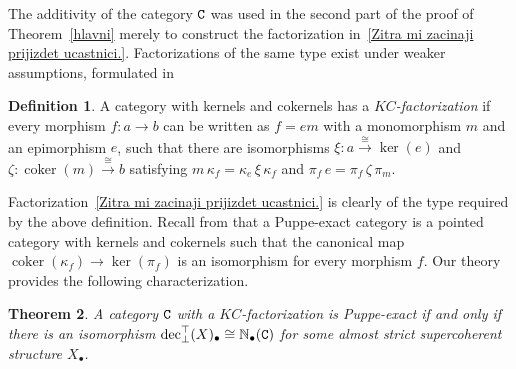 \documentclass[12pt,leqno]{amsart}
\newtheorem{theorem}{Theorem}%
\theoremstyle{definition}
\newtheorem{definition}[theorem]{Definition}
\def\uldec{{\rm dec}_{\bot}^{\top}}
\newcommand{\C}{{\tt C}}
\newcommand{\NN}{\mathbb{N}}
\newcommand{\4}{\texttt{4}}
\DeclareMathOperator{\coker}{coker}
\begin{document}
The additivity of the category $\C$ was used in the second part of the
proof of Theorem~\ref{hlavni} merely to construct the
factorization in~\eqref{Zitra mi zacinaji prijizdet ucastnici.}.
Factorizations of the same type exist under weaker assumptions,
formulated in

\begin{definition}
A category with kernels and cokernels has a
  \textit{$KC$-factorization} if every morphism $f\colon a\to b$
can be written as $f=em$ with a monomorphism $m$ and an epimorphism
$e$, such that  there are isomorphisms
$\xi\colon a\xrightarrow\cong \ker(e)$ and $\zeta\colon
\coker(m)\xrightarrow\cong b$ 
satisfying
$m \,\kappa_f=\kappa_e \,\xi \, \kappa_f$ and $\pi_f \,e=\pi_f \,\zeta\,\pi_m$.
\end{definition}

Factorization~\eqref{Zitra mi zacinaji prijizdet ucastnici.} is
clearly of the type required by the above definition.
Recall from \cite[S.~1.1.]{BorceuxGrandis} that a
Puppe-exact category is a pointed category with kernels and cokernels
such that the canonical map $\coker(\kappa_f)\to \ker(\pi_f)$ is an
isomorphism for every morphism $f$. Our theory provides the following
characterization. 
    
\begin{theorem}
    A category $\C$ with a $KC$-factorization is Puppe-exact if and
    only if there is an isomorphism $\uldec (X)_\bullet\cong
    \NN_\bullet(\C)$ for some almost strict
    supercoherent structure $X_\bullet$.
    \end{theorem}
   
\end{document}
